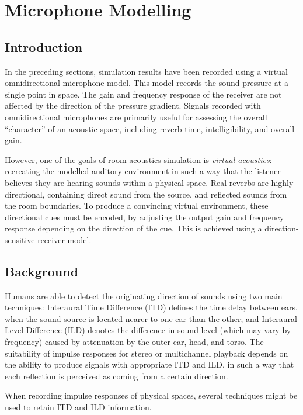 \documentclass[]{scrreprt}
\begin{document}
\chapter{Microphone Modelling}\label{microphone-modelling}

\section{Introduction}\label{introduction-1}

In the preceding sections, simulation results have been recorded using a
virtual omnidirectional microphone model. This model records the sound
pressure at a single point in space. The gain and frequency response of
the receiver are not affected by the direction of the pressure gradient.
Signals recorded with omnidirectional microphones are primarily useful
for assessing the overall ``character'' of an acoustic space, including
reverb time, intelligibility, and overall gain.

However, one of the goals of room acoustics simulation is \emph{virtual
acoustics}: recreating the modelled auditory environment in such a way
that the listener believes they are hearing sounds within a physical
space. Real reverbs are highly directional, containing direct sound from
the source, and reflected sounds from the room boundaries. To produce a
convincing virtual environment, these directional cues must be encoded,
by adjusting the output gain and frequency response depending on the
direction of the cue. This is achieved using a direction-sensitive
receiver model.

\section{Background}\label{background-4}

Humans are able to detect the originating direction of sounds using two
main techniques: Interaural Time Difference (ITD) defines the time delay
between ears, when the sound source is located nearer to one ear than
the other; and Interaural Level Difference (ILD) denotes the difference
in sound level (which may vary by frequency) caused by attenuation by
the outer ear, head, and torso. The suitability of impulse responses for
stereo or multichannel playback depends on the ability to produce
signals with appropriate ITD and ILD, in such a way that each reflection
is perceived as coming from a certain direction.

When recording impulse responses of physical spaces, several techniques
might be used to retain ITD and ILD information.
\end{document}
